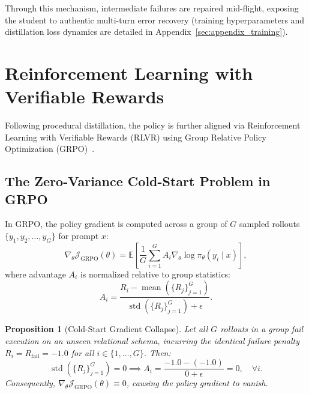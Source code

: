 \documentclass{article}
\theoremstyle{plain}
\newtheorem{proposition}[theorem]{Proposition}
\theoremstyle{definition}
\theoremstyle{remark}
\begin{document}
Through this mechanism, intermediate failures are repaired mid-flight, exposing the student to authentic multi-turn error recovery (training hyperparameters and distillation loss dynamics are detailed in Appendix~\ref{sec:appendix_training}).

\section{Reinforcement Learning with Verifiable Rewards}
\label{sec:rlvr}

Following procedural distillation, the policy is further aligned via Reinforcement Learning with Verifiable Rewards (RLVR) using Group Relative Policy Optimization (GRPO)~\citep{shao2024deepseekmath}.

\subsection{The Zero-Variance Cold-Start Problem in GRPO}
In GRPO, the policy gradient is computed across a group of $G$ sampled rollouts $\{y_1, y_2, \dots, y_G\}$ for prompt $x$:
\begin{equation}
    \nabla_\theta \mathcal{J}_{\text{GRPO}}(\theta) = \mathbb{E} \left[ \frac{1}{G} \sum_{i=1}^G A_i \nabla_\theta \log \pi_\theta(y_i \mid x) \right],
\end{equation}
where advantage $A_i$ is normalized relative to group statistics:
\begin{equation}
    A_i = \frac{R_i - \operatorname{mean}(\{R_j\}_{j=1}^G)}{\operatorname{std}(\{R_j\}_{j=1}^G) + \epsilon}.
    \label{eq:grpo_advantage}
\end{equation}

\begin{proposition}[Cold-Start Gradient Collapse]
Let all $G$ rollouts in a group fail execution on an unseen relational schema, incurring the identical failure penalty $R_i = R_{\text{fail}} = -1.0$ for all $i \in \{1, \dots, G\}$. Then:
\begin{equation}
    \operatorname{std}(\{R_j\}_{j=1}^G) = 0 \implies A_i = \frac{-1.0 - (-1.0)}{0 + \epsilon} = 0, \quad \forall i.
\end{equation}
Consequently, $\nabla_\theta \mathcal{J}_{\text{GRPO}}(\theta) \equiv 0$, causing the policy gradient to vanish.
\end{proposition}
\end{document}
